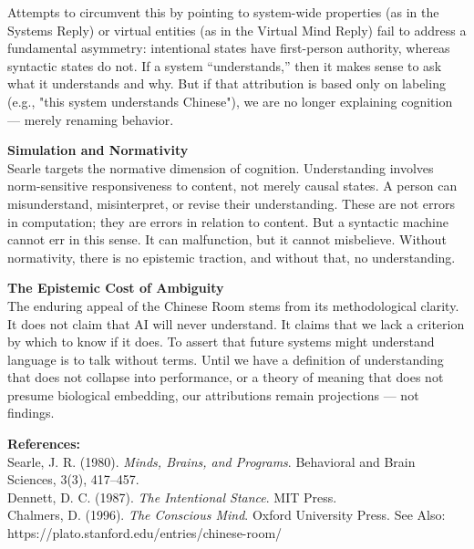 \begin{technical}
Attempts to circumvent this by pointing to system-wide properties (as in the Systems Reply) or virtual entities (as in the Virtual Mind Reply) fail to address a fundamental asymmetry: intentional states have first-person authority, whereas syntactic states do not. If a system “understands,” then it makes sense to ask what it understands and why. But if that attribution is based only on labeling (e.g., "this system understands Chinese"), we are no longer explaining cognition — merely renaming behavior.

\noindent\textbf{Simulation and Normativity}\\[0.5em]
Searle targets the normative dimension of cognition. Understanding involves norm-sensitive responsiveness to content, not merely causal states. A person can misunderstand, misinterpret, or revise their understanding. These are not errors in computation; they are errors in relation to content. But a syntactic machine cannot err in this sense. It can malfunction, but it cannot misbelieve. Without normativity, there is no epistemic traction, and without that, no understanding.

\noindent\textbf{The Epistemic Cost of Ambiguity}\\[0.5em]
The enduring appeal of the Chinese Room stems from its methodological clarity. It does not claim that AI will never understand. It claims that we lack a criterion by which to know if it does. To assert that future systems might understand language is to talk without terms. Until we have a definition of understanding that does not collapse into performance, or a theory of meaning that does not presume biological embedding, our attributions remain projections — not findings.

\vspace{0.5em}
\noindent\textbf{References:}\\
Searle, J. R. (1980). \textit{Minds, Brains, and Programs}. Behavioral and Brain Sciences, 3(3), 417–457.\\
Dennett, D. C. (1987). \textit{The Intentional Stance}. MIT Press.\\
Chalmers, D. (1996). \textit{The Conscious Mind}. Oxford University Press.
See Also: https://plato.stanford.edu/entries/chinese-room/
\end{technical}
